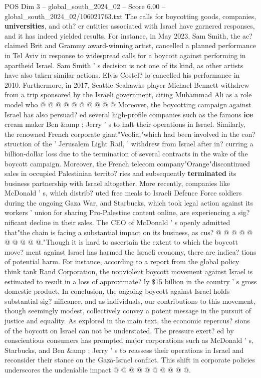 \begin{textsample}{POS Dim 3 – global\_south\_2024\_02 – Score 6.00 – global\_south\_2024\_02/106021763.txt}
The calls for boycotting goods, companies, \textbf{universities}, and oth? er entities associated with Israel have garnered responses, and it has indeed yielded results.
For instance, in May 2023, Sam Smith, the ac? claimed Brit and Grammy award-winning artist, cancelled a planned performance in Tel Aviv in response to widespread calls for a boycott against performing in apartheid Israel.
Sam Smith ' s decision is not one of its kind, as other artists have also taken similar actions.
Elvis Costel? lo cancelled his performance in 2010.
Furthermore, in 2017, Seattle Seahawks player Michael Bennett withdrew from a trip sponsored by the Israeli government, citing Muhammad Ali as a role model who @ @ @ @ @ @ @ @ @ @ Moreover, the boycotting campaign against Israel has also persuad? ed several high-profile companies such as the famous \textbf{ice} cream maker Ben \&amp ; Jerry ' s to halt their operations in Israel.
Similarly, the renowned French corporate giant"Veolia,"which had been involved in the con? struction of the ' Jerusalem Light Rail, ' withdrew from Israel after in? curring a billion-dollar loss due to the termination of several contracts in the wake of the boycott campaign.
Moreover, the French telecom company"Orange"discontinued sales in occupied Palestinian territo? ries and subsequently \textbf{terminated} its business partnership with Israel altogether.
More recently, companies like McDonald ' s, which distrib? uted free meals to Israeli Defence Force soldiers during the ongoing Gaza War, and Starbucks, which took legal action against its workers ' union for sharing Pro-Palestine content online, are experiencing a sig? nificant decline in their sales.
The CEO of McDonald ' s openly admitted that"the chain is facing a substantial impact on its business, as cus? @ @ @ @ @ @ @ @ @ @."Though it is hard to ascertain the extent to which the boycott move? ment against Israel has harmed the Israeli economy, there are indica? tions of potential harm.
For instance, according to a report from the global policy think tank Rand Corporation, the nonviolent boycott movement against Israel is estimated to result in a loss of approximate? ly \$15 billion in the country ' s gross domestic product.
In conclusion, the ongoing boycott against Israel holds substantial sig? nificance, and as individuals, our contributions to this movement, though seemingly modest, collectively convey a potent message in the pursuit of justice and equality.
As explored in the main text, the economic repercus? sions of the boycott on Israel can not be understated.
The pressure exert? ed by conscientious consumers has prompted major corporations such as McDonald ' s, Starbucks, and Ben \&amp ; Jerry ' s to reassess their operations in Israel and reconsider their stance on the Gaza-Israel conflict.
This shift in corporate policies underscores the undeniable impact @ @ @ @ @ @ @ @ @ @.

\end{textsample}
